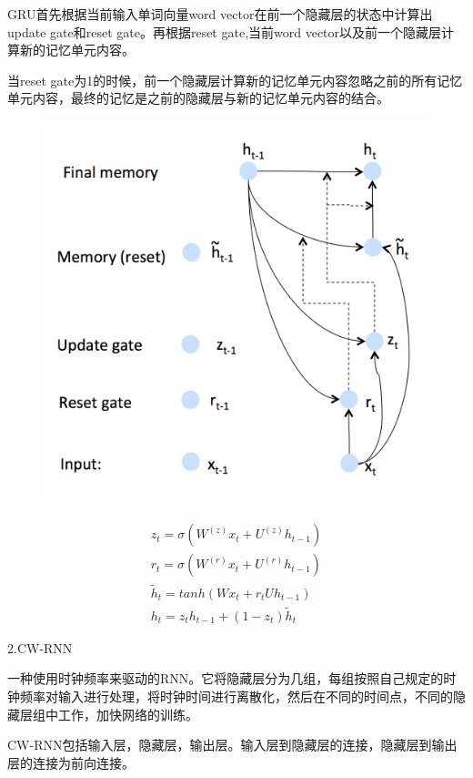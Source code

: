 \documentclass[openbib]{article}
\begin{document}
GRU首先根据当前输入单词向量word vector在前一个隐藏层的状态中计算出update gate和reset gate。再根据reset gate,当前word vector以及前一个隐藏层计算新的记忆单元内容。

当reset gate为1的时候，前一个隐藏层计算新的记忆单元内容忽略之前的所有记忆单元内容，最终的记忆是之前的隐藏层与新的记忆单元内容的结合。

\begin{figure}[htbp]
	\centering
	\includegraphics[scale=0.2]{GRU结构图}
\end{figure}
\begin{align*}
	z_t=\sigma(W^{(z)}x_t+U^{(z)}h_{t-1})	\\
	r_t=\sigma(W^{(r)}x_t+U^{(r)}h_{t-1})	\\
	\widetilde{h}_t = tanh(Wx_t + r_tUh_{t-1}) 	\\
	h_t=z_th_{t-1}+(1-z_t)\widetilde{h}_t
\end{align*}

\begin{center}
	2.CW-RNN
\end{center} 

一种使用时钟频率来驱动的RNN。它将隐藏层分为几组，每组按照自己规定的时钟频率对输入进行处理，将时钟时间进行离散化，然后在不同的时间点，不同的隐藏层组中工作，加快网络的训练。

CW-RNN包括输入层，隐藏层，输出层。输入层到隐藏层的连接，隐藏层到输出层的连接为前向连接。
\end{document}
